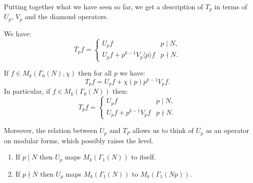  Putting together what we have seen so far, we get a description of $T_p$ in terms of $U_p$, $V_p$ and the diamond operators.
\begin{theorem}
We have:
\[
T_p f = \begin{cases}
U_p f&p\mid N,\\
U_p f + p^{k-1} V_p\langle p\rangle f&p\nmid N.
\end{cases}
\]
\end{theorem}
\begin{corollary}
  If $f\in M_k(\Gamma_0(N),\chi)$ then for all $p$ we have:
\[
T_p f= U_p f +\chi(p)p^{k-1}V_p f.
\]
In particular, if $f\in M_k(\Gamma_0(N))$ then:
\[
T_p f =
\begin{cases}
  U_p f&p\mid N,\\
U_p f +p^{k-1}V_pf& p\nmid N.
\end{cases}
\]
\end{corollary}
Moreover, the relation between $U_p$ and $T_P$ allows us to think of $U_p$ as an operator on modular forms, which possibly raises the level.
\begin{corollary}
  \begin{enumerate}
  \item   If $p\mid N$ then $U_p$ maps $M_k(\Gamma_1(N))$ to itself.
\item  If $p\nmid N$ then $U_p$ maps $M_k(\Gamma_1(N))$ to $M_k(\Gamma_1(Np))$.
  \end{enumerate}

\end{corollary}

